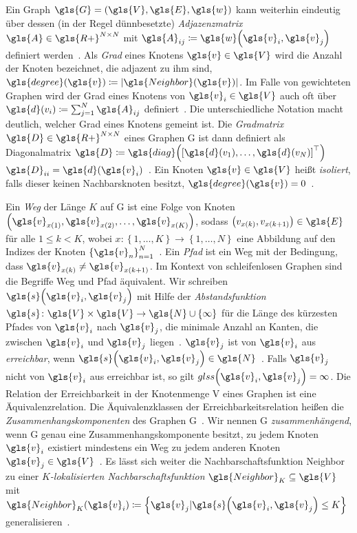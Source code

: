 Ein Graph $\gls{G} = \left(\gls{V}, \gls{E}, \gls{w}\right)$ kann weiterhin eindeutig über dessen (in der Regel dünnbesetzte) \emph{Adjazenzmatrix} $\gls{A} \in \gls{R+}^{N \times N}$ mit $\gls{A}_{ij} \coloneqq \gls{w}\left(\gls{v}_i, \gls{v}_j\right)$ definiert werden~\cite{Defferrard}.
Als \emph{Grad} eines Knotens $\gls{v} \in \gls{V}$ wird die Anzahl der Knoten bezeichnet, die adjazent zu ihm sind, \dhe{} $\gls{degree}\left(\gls{v}\right) \coloneqq \left|\gls{Neighbor}\left(\gls{v}\right)\right|$.
Im Falle von gewichteten Graphen wird der Grad eines Knotens von $\gls{v}_i \in \gls{V}$ auch oft über $\gls{d}\left(v_i\right) \coloneqq \sum^N_{j=1} \gls{A}_{ij}$ definiert~\cite{Defferrard}.
Die unterschiedliche Notation macht deutlich, welcher Grad eines Knotens gemeint ist.
Die \emph{Gradmatrix} $\gls{D} \in \gls{R+}^{N \times N}$ eines Graphen \gls{G} ist dann definiert als Diagonalmatrix $\gls{D} \coloneqq \gls{diag}\left( {\left[ \gls{d}\left(v_1\right), \ldots, \gls{d}\left(v_N\right) \right]}^{\top} \right)$ \bzw{} $\gls{D}_{ii} = \gls{d}\left(\gls{v}_i\right)$~\cite{Defferrard}.
Ein Knoten $\gls{v} \in \gls{V}$ heißt \emph{isoliert}, falls dieser keinen Nachbarsknoten besitzt, \dhe{} $\gls{degree}\left(\gls{v}\right) = 0$~\cite{Defferrard}.

Ein \emph{Weg} der Länge $K$ auf \gls{G} ist eine Folge von Knoten $\left(\gls{v}_{x\left(1\right)}, \gls{v}_{x\left(2\right)}, \ldots, \gls{v}_{x\left(K\right)}\right)$, sodass $\left(v_{x\left(k\right)}, v_{x\left(k+1\right)}\right) \in \gls{E}$ für alle $1 \leq k < K$, wobei $x \colon \left\{ 1, \ldots, K \right\} \to \left\{ 1, \ldots, N \right\}$ eine Abbildung auf den Indizes der Knoten ${\left\{ \gls{v}_n \right\}}^N_{n=1}$~\cite{Biggs}.
Ein \emph{Pfad} ist ein Weg mit der Bedingung, dass $\gls{v}_{x\left(k\right)} \neq \gls{v}_{x\left(k+1\right)}$.
Im Kontext von schleifenlosen Graphen sind die Begriffe Weg und Pfad äquivalent.
Wir schreiben $\gls{s}\left(\gls{v}_i, \gls{v}_j\right)$ mit Hilfe der \emph{Abstandsfunktion} $\gls{s} \colon \gls{V} \times \gls{V} \to \gls{N} \cup \left\{\infty\right\}$ für die Länge des kürzesten Pfades von $\gls{v}_i$ nach $\gls{v}_j$, \dhe{} die minimale Anzahl an Kanten, die zwischen $\gls{v}_i$ und $\gls{v}_j$ liegen~\cite{Hammond}.
$\gls{v}_j$ ist von $\gls{v}_i$ aus \emph{erreichbar}, wenn $\gls{s}\left(\gls{v}_i, \gls{v}_j\right) \in \gls{N}$~\cite{Biggs}.
Falls $\gls{v}_j$ nicht von $\gls{v}_i$ aus erreichbar ist, so gilt $gls{s}\left(\gls{v}_i, \gls{v}_j\right) = \infty$.
Die Relation der Erreichbarkeit in der Knotenmenge \gls{V} eines Graphen ist eine Äquivalenzrelation.
Die Äquivalenzklassen der Erreichbarkeitsrelation heißen die \emph{Zusammenhangskomponenten} des Graphen \gls{G}~\cite{Biggs}.
Wir nennen \gls{G} \emph{zusammenhängend}, wenn \gls{G} genau eine Zusammenhangskomponente besitzt, \dhe{} zu jedem Knoten $\gls{v}_i$ existiert mindestens ein Weg zu jedem anderen Knoten $\gls{v}_j \in \gls{V}$~\cite{Hammond}.
Es lässt sich weiter die Nachbarschaftsfunktion \gls{Neighbor} zu einer \emph{$K$-lokalisierten Nachbarschaftsfunktion} $\gls{Neighbor}_K \subseteq \gls{V}$ mit $\gls{Neighbor}_K\left(\gls{v}_i\right) \coloneqq \left\{ \gls{v}_j | \gls{s}\left(\gls{v}_i, \gls{v}_j\right) \leq K \right\}$ generalisieren~\cite{Hammond}.

